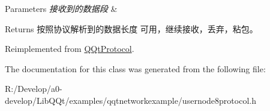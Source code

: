 \begin{DoxyParams}{Parameters}
{\em 接收到的数据段} & \\
\hline
\end{DoxyParams}
\begin{DoxyReturn}{Returns}
按照协议解析到的数据长度 可用，继续接收，丢弃，粘包。 
\end{DoxyReturn}


Reimplemented from \mbox{\hyperlink{class_q_qt_protocol_a00fd0c1ac23379ed3b9b25da9a34f39b}{Q\+Qt\+Protocol}}.



The documentation for this class was generated from the following file\+:\begin{DoxyCompactItemize}
\item 
R\+:/\+Develop/a0-\/develop/\+Lib\+Q\+Qt/examples/qqtnetworkexample/usernode8protocol.\+h\end{DoxyCompactItemize}

